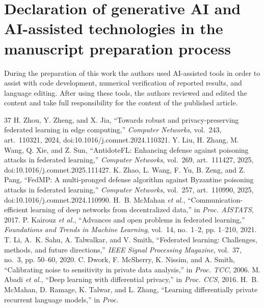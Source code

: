 \documentclass[final,1p,times]{elsarticle}
\newcommand{\etal}{\emph{et al.}}
\begin{document}
\section*{Declaration of generative AI and AI-assisted technologies in the manuscript preparation process}
During the preparation of this work the authors used AI-assisted tools in
order to assist with code development, numerical verification of reported
results, and language editing. After using these tools, the authors
reviewed and edited the content and take full responsibility for the
content of the published article.

\begin{thebibliography}{37}
H. Zhou, Y. Zheng, and X. Jia, ``Towards robust and privacy-preserving
federated learning in edge computing,'' \emph{Computer Networks},
vol.~243, art.~110321, 2024, doi:10.1016/j.comnet.2024.110321.
Y. Liu, H. Zhang, M. Wang, Q. Xie, and Z. Sun, ``AntidoteFL: Enhancing
defense against poisoning attacks in federated learning,'' \emph{Computer
Networks}, vol.~269, art.~111427, 2025, doi:10.1016/j.comnet.2025.111427.
K. Zhao, L. Wang, F. Yu, B. Zeng, and Z. Pang, ``FedMP: A multi-pronged
defense algorithm against Byzantine poisoning attacks in federated
learning,'' \emph{Computer Networks}, vol.~257, art.~110990, 2025,
doi:10.1016/j.comnet.2024.110990.
H.~B. McMahan \etal, ``Communication-efficient learning of deep networks
from decentralized data,'' in \emph{Proc. AISTATS}, 2017.
P. Kairouz \etal, ``Advances and open problems in federated learning,''
\emph{Foundations and Trends in Machine Learning}, vol.~14, no.~1--2,
pp. 1--210, 2021.
T. Li, A.~K. Sahu, A. Talwalkar, and V. Smith, ``Federated learning:
Challenges, methods, and future directions,'' \emph{IEEE Signal
Processing Magazine}, vol.~37, no.~3, pp. 50--60, 2020.
C. Dwork, F. McSherry, K. Nissim, and A. Smith, ``Calibrating noise to
sensitivity in private data analysis,'' in \emph{Proc. TCC}, 2006.
M. Abadi \etal, ``Deep learning with differential privacy,'' in
\emph{Proc. CCS}, 2016.
H.~B. McMahan, D. Ramage, K. Talwar, and L. Zhang, ``Learning
differentially private recurrent language models,'' in \emph{Proc.
}
\end{thebibliography}
\end{document}
